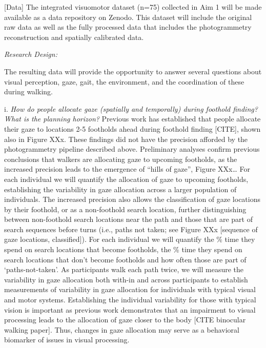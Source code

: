 {[}Data{]} The integrated visuomotor dataset (n=75) collected in Aim 1
will be made available as a data repository on Zenodo. This dataset will
include the original raw data as well as the fully processed data that
includes the photogrammetry reconstruction and spatially calibrated
data.

\emph{Research Design:}

The resulting data will provide the opportunity to answer several
questions about visual perception, gaze, gait, the environment, and the
coordination of these during walking.

i. \emph{How do people allocate gaze (spatially and temporally) during
foothold finding? What is the planning horizon?} Previous work has
established that people allocate their gaze to locations 2-5 footholds
ahead during foothold finding {[}CITE{]}, shown also in Figure XXx.
These findings did not have the precision afforded by the photogrammetry
pipeline described above. Preliminary analyses confirm previous
conclusions that walkers are allocating gaze to upcoming footholds, as
the increased precision leads to the emergence of ``hills of gaze'',
Figure XXx\ldots{} For each individual we will quantify the allocation
of gaze to upcoming footholds, establishing the variability in gaze
allocation across a larger population of individuals. The increased
precision also allows the classification of gaze locations by their
foothold, or as a non-foothold search location, further distinguishing
between non-foothold search locations near the path and those that are
part of search sequences before turns (i.e., paths not taken; see Figure
XXx {[}sequence of gaze locations, classified{]}). For each individual
we will quantify the \% time they spend on search locations that become
footholds, the \% time they spend on search locations that don't become
footholds and how often those are part of `paths-not-taken'. As
participants walk each path twice, we will measure the variability in
gaze allocation both with-in and across participants to establish
measurements of variability in gaze allocation for individuals with
typical visual and motor systems. Establishing the individual
variability for those with typical vision is important as previous work
demonstrates that an impairment to visual processing leads to the
allocation of gaze closer to the body {[}CITE binocular walking
paper{]}. Thus, changes in gaze allocation may serve as a behavioral
biomarker of issues in visual processing.

